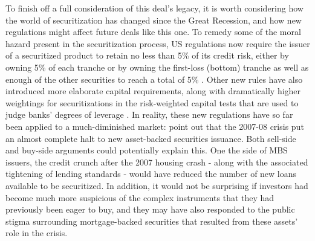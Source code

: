 \documentclass[12pt]{article}
\begin{document}
To finish off a full consideration of this deal’s legacy, it is worth considering how the world of securitization has changed since the Great Recession, and how new regulations might affect future deals like this one. To remedy some of the moral hazard present in the securitization process, US regulations now require the issuer of a securitized product to retain no less than 5\% of its credit risk, either by owning 5\% of each tranche or by owning the first-loss (bottom) tranche as well as enough of the other securities to reach a total of 5\% \parencite{scheicher17}. Other new rules have also introduced more elaborate capital requirements, along with dramatically higher weightings for securitizations in the risk-weighted capital tests that are used to judge banks’ degrees of leverage \parencite{scheicher17}. In reality, these new regulations have so far been applied to a much-diminished market: \textcite{gorton12} point out that the 2007-08 crisis put an almost complete halt to new asset-backed securities issuance. Both sell-side and buy-side arguments could potentially explain this. One the side of MBS issuers, the credit crunch after the 2007 housing crash - along with the associated tightening of lending standards - would have reduced the number of new loans available to be securitized. In addition, it would not be surprising if investors had become much more suspicious of the complex instruments that they had previously been eager to buy, and they may have also responded to the public stigma surrounding mortgage-backed securities that resulted from these assets’ role in the crisis.
\end{document}
